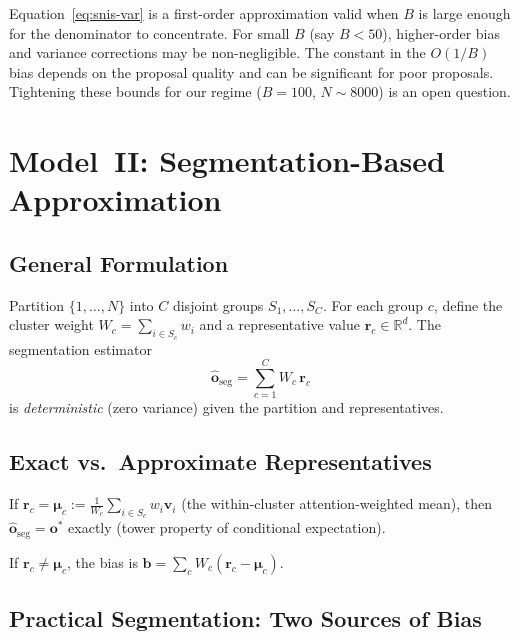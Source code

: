 \documentclass[11pt,a4paper]{article}
\theoremstyle{definition}
\newcommand{\vv}{\mathbf{v}}
\newcommand{\oo}{\mathbf{o}}
\newcommand{\rr}{\mathbf{r}}
\newcommand{\bb}{\mathbf{b}}
\newcommand{\bmu}{\boldsymbol{\mu}}
\begin{document}
\begin{researchnote}
Equation~\eqref{eq:snis-var} is a first-order approximation valid when $B$ is
large enough for the denominator to concentrate.  For small $B$ (say $B<50$),
higher-order bias and variance corrections may be non-negligible.  The
constant in the $O(1/B)$ bias depends on the proposal quality and can be
significant for poor proposals.  Tightening these bounds for our regime
($B=100$, $N\sim8000$) is an open question.
\end{researchnote}

\section{Model~II: Segmentation-Based Approximation}\label{sec:seg}

\subsection{General Formulation}

Partition $\{1,\dots,N\}$ into $C$ disjoint groups $S_1,\dots,S_C$.
For each group $c$, define the cluster weight $W_c=\sum_{i\in S_c}w_i$
and a representative value $\rr_c\in\mathbb{R}^d$.
The segmentation estimator
\begin{equation}\label{eq:seg}
  \hat{\oo}_{\mathrm{seg}} = \sum_{c=1}^{C} W_c\,\rr_c
\end{equation}
is \emph{deterministic} (zero variance) given the partition and representatives.

\subsection{Exact vs.\ Approximate Representatives}

If $\rr_c = \bmu_c := \frac{1}{W_c}\sum_{i\in S_c}w_i\vv_i$
(the within-cluster attention-weighted mean), then
$\hat{\oo}_{\mathrm{seg}} = \oo^{*}$ exactly (tower property of conditional
expectation).

If $\rr_c\ne\bmu_c$, the bias is
$\bb = \sum_{c}W_c(\rr_c - \bmu_c)$.

\subsection{Practical Segmentation: Two Sources of Bias}\label{sec:two-sources}
\end{document}
